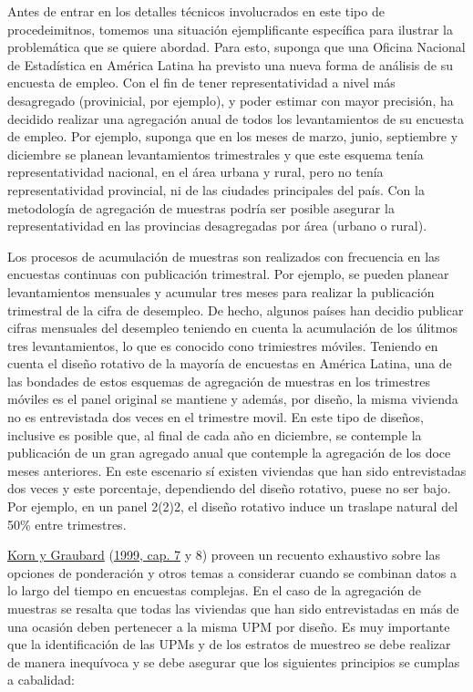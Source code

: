\documentclass[
  12pt,
  spanish,
]{book}
\begin{document}
Antes de entrar en los detalles técnicos involucrados en este tipo de procedeimitnos, tomemos una situación ejemplificante específica para ilustrar la problemática que se quiere abordad. Para esto, suponga que una Oficina Nacional de Estadística en América Latina ha previsto una nueva forma de análisis de su encuesta de empleo. Con el fin de tener representatividad a nivel más desagregado (provinicial, por ejemplo), y poder estimar con mayor precisión, ha decidido realizar una agregación anual de todos los levantamientos de su encuesta de empleo. Por ejemplo, suponga que en los meses de marzo, junio, septiembre y diciembre se planean levantamientos trimestrales y que este esquema tenía representatividad nacional, en el área urbana y rural, pero no tenía representatividad provincial, ni de las ciudades principales del país. Con la metodología de agregación de muestras podría ser posible asegurar la representatividad en las provincias desagregadas por área (urbano o rural).

Los procesos de acumulación de muestras son realizados con frecuencia en las encuestas continuas con publicación trimestral. Por ejemplo, se pueden planear levantamientos mensuales y acumular tres meses para realizar la publicación trimestral de la cifra de desempleo. De hecho, algunos países han decidio publicar cifras mensuales del desempleo teniendo en cuenta la acumulación de los úlitmos tres levantamientos, lo que es conocido cono trimiestres móviles. Teniendo en cuenta el diseño rotativo de la mayoría de encuestas en América Latina, una de las bondades de estos esquemas de agregación de muestras en los trimestres móviles es el panel original se mantiene y además, por diseño, la misma vivienda no es entrevistada dos veces en el trimestre movil. En este tipo de diseños, inclusive es posible que, al final de cada año en diciembre, se contemple la publicación de un gran agregado anual que contemple la agregación de los doce meses anteriores. En este escenario sí existen viviendas que han sido entrevistadas dos veces y este porcentaje, dependiendo del diseño rotativo, puese no ser bajo. Por ejemplo, en un panel 2(2)2, el diseño rotativo induce un traslape natural del 50\% entre trimestres.

\protect\hyperlink{ref-Korn_Graubard_1999}{Korn y Graubard} (\protect\hyperlink{ref-Korn_Graubard_1999}{1999, cap. 7} y 8) proveen un recuento exhaustivo sobre las opciones de ponderación y otros temas a considerar cuando se combinan datos a lo largo del tiempo en encuestas complejas. En el caso de la agregación de muestras se resalta que todas las viviendas que han sido entrevistadas en más de una ocasión deben pertenecer a la misma UPM por diseño. Es muy importante que la identificación de las UPMs y de los estratos de muestreo se debe realizar de manera inequívoca y se debe asegurar que los siguientes principios se cumplas a cabalidad:
\end{document}
